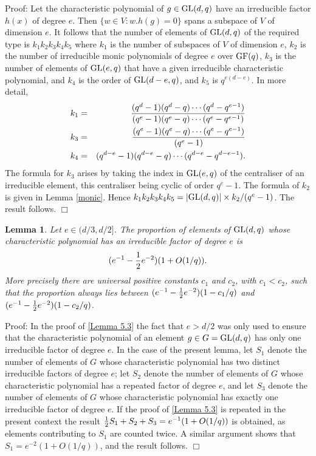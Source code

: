 \documentclass[12pt]{article}
\newtheorem{lemma}[definition]{Lemma}
\newenvironment{proof}{\normalsize {\sc Proof}:}{{\hfill $\Box$ \\}}
\def\GL{{\rm GL}}
\def\GF{{\rm GF}}
\begin{document}
\begin{proof}
Let the characteristic polynomial of $g\in\GL(d,q)$ have an
irreducible factor $h(x)$ of degree $e$. Then $\{w\in V:w.h(g)=0\}$ spans
a subspace of $V$ of dimension $e$. It follows that the number of
elements of $\GL(d,q)$ of the required type  is $k_1k_2k_3k_4k_5$
where $k_1$ is the number of subspaces of $V$ of dimension $e$, 
$k_2$ is the number of irreducible monic polynomials of degree $e$
over $\GF(q)$, $k_3$ is the number of elements of $\GL(e,q)$ that
have a given irreducible characteristic polynomial, and $k_4$ is the
order of $\GL(d-e,q)$, and $k_5$ is $q^{e(d-e)}$. 
In more detail, 
\begin{eqnarray*}
k_1 & = & (q^d-1)(q^d-q)\cdots(q^d-q^{e-1})\over(q^e-1)(q^e-q) \cdots (q^e-q^{e-1}) \\
k_3 & = & (q^e-1)(q^e-q)\cdots(q^e-q^{e-1})\over (q^e-1) \\
k_4 & = & (q^{d-e}-1)(q^{d-e}-q) \cdots (q^{d-e}-q^{d-e-1}).
\end{eqnarray*}
The formula for $k_3$ arises by taking
the index in $\GL(e,q)$ of the centraliser of an irreducible element,
this centraliser being cyclic of order $q^e-1$. 
The formula of $k_2$ is given in Lemma \ref{monic}. 
Hence $k_1 k_2 k_3 k_4 k_5 = \vert\GL(d,q)\vert\times k_2/(q^e-1)$. 
The result follows. 
\end{proof}

\begin{lemma}\label{Lemma5.4} Let $e\in(d/3,d/2]$.
The proportion of elements of $\GL(d,q)$ whose characteristic
polynomial has an irreducible factor of degree $e$  is
$$(e^{-1}-{1\over2}e^{-2})(1+O(1/q)).$$
More precisely there are universal positive constants $c_1$ and $c_2$, 
with $c_1<c_2$, such that the proportion always lies between 
$(e^{-1}-{1\over2}e^{-2})(1-c_1/q)$ and $(e^{-1}-{1\over2}e^{-2})(1-c_2/q)$.
\end{lemma}
 
\begin{proof}  In the proof of \ref{Lemma 5.3} the fact that $e>d/2$ was only used
to ensure that the characteristic polynomial of an element $g\in G=\GL(d,q)$ has 
only one irreducible factor of degree $e$.  In the case of the present lemma,
let $S_1$ denote the number of elements of $G$ whose characteristic polynomial
has two distinct irreducible factors of degree $e$; let $S_2$ denote the number
of elements of $G$ whose characteristic polynomial has a repeated factor of
degree $e$, and let $S_3$ denote the number of elements of $G$ whose characteristic
polynomial has exactly one irreducible factor of degree $e$.  If the proof of \ref{Lemma 5.3}
is repeated in the present context the result ${1\over2}S_1+S_2+S_3=e^{-1}(1+O(1/q))$
is obtained, as elements contributing to $S_1$ are counted twice.  A similar argument
shows that $S_1=e^{-2}(1+O(1/q))$, and the result follows.
\end{proof}
\end{document}
